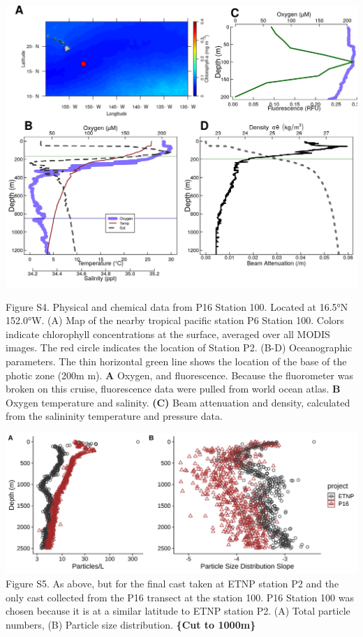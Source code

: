\documentclass[]{article}
\begin{document}
\includegraphics{../figures/CombinedP16S100Info.png}

Figure S4. Physical and chemical data from P16 Station 100. Located at
16.5°N 152.0°W. (A) Map of the nearby tropical pacific station P6
Station 100. Colors indicate chlorophyll concentrations at the surface,
averaged over all MODIS images. The red circle indicates the location of
Station P2. (B-D) Oceanographic parameters. The thin horizontal green
line shows the location of the base of the photic zone (200m m).
\textbf{A} Oxygen, and fluorescence. Because the fluorometer was broken
on this cruise, fluorescence data were pulled from world ocean atlas.
\textbf{B} Oxygen temperature and salinity. \textbf{(C)} Beam
attenuation and density, calculated from the salininity temperature and
pressure data.

\includegraphics{../figures/ParticlesAndPSD_ETNPVsP16.svg} Figure S5. As
above, but for the final cast taken at ETNP station P2 and the only cast
collected from the P16 transect at the station 100. P16 Station 100 was
chosen because it is at a similar latitude to ETNP station P2. (A) Total
particle numbers, (B) Particle size distribution. \textbf{\{Cut to
1000m\}}
\end{document}
